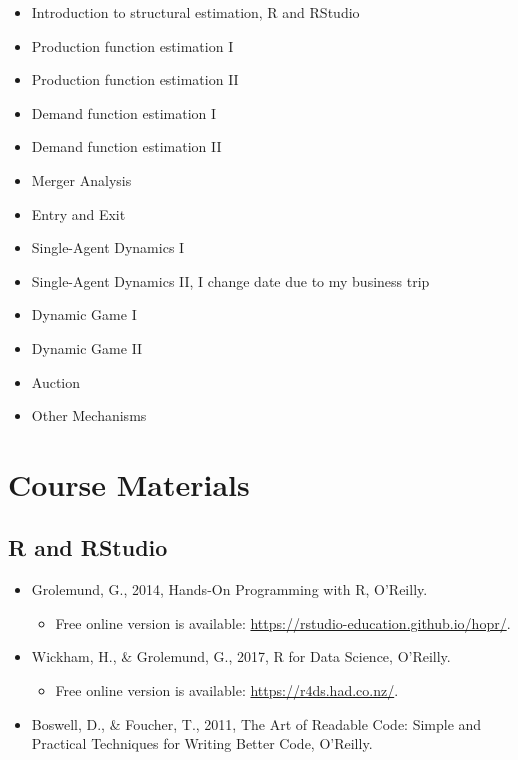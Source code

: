 \documentclass[
]{book}
\providecommand{\tightlist}{%
  \setlength{\itemsep}{0pt}\setlength{\parskip}{0pt}}
\begin{document}
\begin{itemize}
\tightlist
\item
  Introduction to structural estimation, R and RStudio
\item
  Production function estimation I
\item
  Production function estimation II
\item
  Demand function estimation I
\item
  Demand function estimation II
\item
  Merger Analysis
\item
  Entry and Exit
\item
  Single-Agent Dynamics I
\item
  Single-Agent Dynamics II, I change date due to my business trip
\item
  Dynamic Game I
\item
  Dynamic Game II
\item
  Auction
\item
  Other Mechanisms
\end{itemize}

\hypertarget{course-materials}{%
\section{Course Materials}\label{course-materials}}

\hypertarget{r-and-rstudio}{%
\subsection{R and RStudio}\label{r-and-rstudio}}

\begin{itemize}
\tightlist
\item
  Grolemund, G., 2014, Hands-On Programming with R, O'Reilly.

  \begin{itemize}
  \tightlist
  \item
    Free online version is available: \url{https://rstudio-education.github.io/hopr/}.
  \end{itemize}
\item
  Wickham, H., \& Grolemund, G., 2017, R for Data Science, O'Reilly.

  \begin{itemize}
  \tightlist
  \item
    Free online version is available: \url{https://r4ds.had.co.nz/}.
  \end{itemize}
\item
  Boswell, D., \& Foucher, T., 2011, The Art of Readable Code: Simple and Practical Techniques for Writing Better Code, O'Reilly.
\end{itemize}
\end{document}
